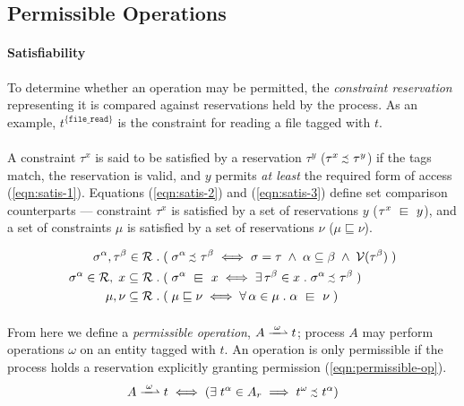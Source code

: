\subsection{Permissible Operations}

\paragraph{Satisfiability} To determine whether an operation may be permitted, the \textit{constraint reservation} representing it is compared against reservations held by the process. As an example, $t^{\{\texttt{file\_read}\}}$ is the constraint for reading a file tagged with $t$.

\paragraph{} A constraint $\tau^{x}$ is said to be satisfied by a reservation $\tau^{y}$ ($\tau^{x} \sprecsim \tau^{y}$) if the tags match, the reservation is valid, and $y$ permits \textit{at least} the required form of access (\ref{eqn:satis-1}). Equations (\ref{eqn:satis-2}) and (\ref{eqn:satis-3}) define set comparison counterparts --- constraint $\tau^{x}$ is satisfied by a set of reservations $y$ ($\tau^{x} \sqin y$), and a set of constraints $\mu$ is satisfied by a set of reservations $\nu$ ($\mu \sqsubseteq \nu$).

\vspace{-5mm}
\begin{align}
    \sigma^{\alpha}, \tau^{\beta} \in \mathcal{R} &\;.\; (\; \sigma^{\alpha} \sprecsim \tau^{\beta} \iff \sigma = \tau \;\wedge\; \alpha \subseteq \beta \;\wedge\; \mathcal{V}(\tau^{\beta}) \;) \label{eqn:satis-1}\\
    \sigma^{\alpha} \in \mathcal{R}, \; x \subseteq \mathcal{R} &\;.\;  (\; \sigma^{\alpha} \sqin x \iff \exists \, \tau^{\beta} \in x \;.\; \sigma^{\alpha} \sprecsim \tau^{\beta} \;) \label{eqn:satis-2}\\
    \mu, \nu \subseteq \mathcal{R} &\;.\;  (\; \mu \sqsubseteq \nu \iff \forall \, \alpha \in \mu \;.\; \alpha \sqin \nu \;) \label{eqn:satis-3}
\end{align}

\paragraph{} From here we define a \textit{permissible operation}, $A \xrightharpoonup{\;\omega\;} t$; process $A$ may perform operations $\omega$ on an entity tagged with $t$. An operation is only permissible if the process holds a reservation explicitly granting permission (\ref{eqn:permissible-op}).
\begin{equation}
    \label{eqn:permissible-op}
    A \xrightharpoonup{\;\omega\;} t \iff (\exists \; t^{\alpha} \in A_r \implies t^{\omega} \sprecsim t^{\alpha})
\end{equation}

